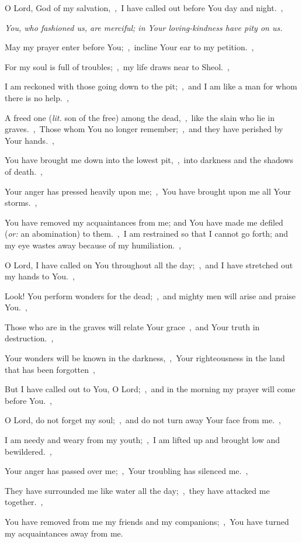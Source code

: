 \documentclass[12pt,twoside,a5paper]{article}
\newcommand{\qanona}[1]{{\liturgicalhint{Qanona.} \emph{#1}}}
\newcommand{\translationoption}[1]{\emph{or:} #1}
\newcommand{\translationliteral}[1]{\emph{lit.} #1}
\begin{document}
\begin{normalparskip}
  O Lord, God of my salvation,~\sep\ I have called out before You day and night.~\sep

  \qanona{You, who fashioned us, are merciful; in Your loving-kindness have pity on us.}

  May my prayer enter before You;~\sep\ incline Your ear to my petition.~\sep

  For my soul is full of troubles;~\sep\ my life draws near to Sheol.~\sep

  I am reckoned with those going down to the pit;~\sep\ and I am like a man for whom there is no help.~\sep

  A freed one (\translationliteral{son of the free}) among the dead,~\sep\ like the slain who lie in graves.~\sep\ Those whom You no longer remember;~\sep\ and they have perished by Your hands.~\sep

  You have brought me down into the lowest pit,~\sep\ into darkness and the shadows of death.~\sep

  Your anger has pressed heavily upon me;~\sep\ You have brought upon me all Your storms.~\sep

  You have removed my acquaintances from me; and You have made me defiled (\translationoption{an abomination}) to them.~\sep\ I am restrained so that I cannot go forth; and my eye wastes away because of my humiliation.~\sep

  O Lord, I have called on You throughout all the day;~\sep\ and I have stretched out my hands to You.~\sep

  Look! You perform wonders for the dead;~\sep\ and mighty men will arise and praise You.~\sep

  Those who are in the graves will relate Your grace~\sep\ and Your truth in destruction.~\sep

  Your wonders will be known in the darkness,~\sep\ Your righteousness in the land that has been forgotten~\sep

  But I have called out to You, O Lord;~\sep\ and in the morning my prayer will come before You.~\sep

  O Lord, do not forget my soul;~\sep\ and do not turn away Your face from me.~\sep

  I am needy and weary from my youth;~\sep\ I am lifted up and brought low and bewildered.~\sep

  Your anger has passed over me;~\sep\ Your troubling has silenced me.~\sep

  They have surrounded me like water all the day;~\sep\ they have attacked me together.~\sep

  You have removed from me my friends and my companions;~\sep\ You have turned my acquaintances away from me.
\end{normalparskip}
\end{document}
